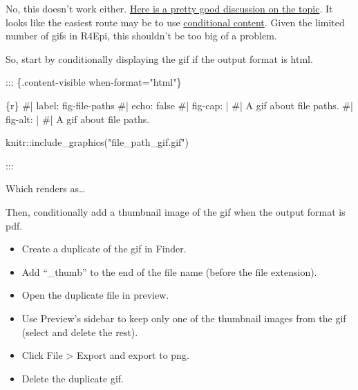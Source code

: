\documentclass[
  letterpaper,
  DIV=11,
  numbers=noendperiod]{scrreprt}
\newenvironment{Shaded}{\begin{snugshade}}{\end{snugshade}}
\newcommand{\InformationTok}[1]{\textcolor[rgb]{0.37,0.37,0.37}{#1}}
\newcommand{\NormalTok}[1]{\textcolor[rgb]{0.00,0.23,0.31}{#1}}
\providecommand{\tightlist}{%
  \setlength{\itemsep}{0pt}\setlength{\parskip}{0pt}}\usepackage{longtable,booktabs,array}
\begin{document}
No, this doesn't work either.
\href{https://github.com/quarto-dev/quarto-cli/discussions/3551}{Here is
a pretty good discussion on the topic}. It looks like the easiest route
may be to use
\href{https://quarto.org/docs/authoring/conditional.html}{conditional
content}. Given the limited number of gifs in R4Epi, this shouldn't be
too big of a problem.

So, start by conditionally displaying the gif if the output format is
html.

\begin{Shaded}
\begin{Highlighting}[]

\NormalTok{::: \{.content{-}visible when{-}format="html"\}}

\InformationTok{\textasciigrave{}\textasciigrave{}\textasciigrave{}\{r\}}
\InformationTok{\#| label: fig{-}file{-}paths}
\InformationTok{\#| echo: false}
\InformationTok{\#| fig{-}cap: |}
\InformationTok{\#|   A gif about file paths.}
\InformationTok{\#| fig{-}alt: |}
\InformationTok{\#|   A gif about file paths.}

\InformationTok{knitr::include\_graphics("file\_path\_gif.gif")}
\InformationTok{\textasciigrave{}\textasciigrave{}\textasciigrave{}}

\NormalTok{:::}
\end{Highlighting}
\end{Shaded}

Which renders as\ldots{}

Then, conditionally add a thumbnail image of the gif when the output
format is pdf.

\begin{itemize}
\tightlist
\item
  Create a duplicate of the gif in Finder.
\item
  Add ``\_thumb'' to the end of the file name (before the file
  extension).
\item
  Open the duplicate file in preview.
\item
  Use Preview's sidebar to keep only one of the thumbnail images from
  the gif (select and delete the rest).
\item
  Click File \textgreater{} Export and export to png.
\item
  Delete the duplicate gif.
\end{itemize}
\end{document}
